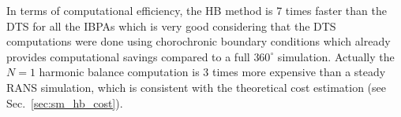 In terms of computational efficiency, the HB method is 7 times faster
than the DTS for all the IBPAs which is very good considering 
that the DTS computations
were done using chorochronic boundary conditions which already
provides computational savings compared to a
full $360^\circ$ simulation. Actually the $N=1$ harmonic
balance computation is 3 times more expensive than a
steady RANS simulation, which is consistent with the
theoretical cost estimation (see Sec.~\ref{sec:sm_hb_cost}).
